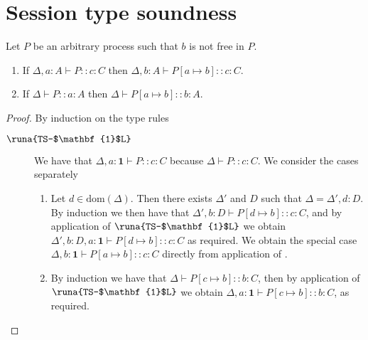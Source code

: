 \chapter{Session type soundness}\label{app:dasetallsoundness}
\setcounter{theorem}{11}
%

\begin{lemma}
Let $P$ be an arbitrary process such that $b$ is not free in $P$. 
\begin{enumerate}
\item If $\Delta,a:A\vdash P :: c\!:\!C$ then $\Delta,b:A\vdash P[a\mapsto b] :: c\!:\!C$.

\item If $\Delta\vdash P :: a\!:\!A$ then $\Delta\vdash P[a\mapsto b] :: b\!:\!A$.
\end{enumerate}
\begin{proof}
By induction on the type rules
\begin{description}
\item[$\runa{TS-$\mathbf{1}$L}$] We have that $\Delta,a:\mathbf{1} \vdash P :: c\!:\!C$ because $\Delta \vdash P :: c\!:\!C$. We consider the cases separately
\begin{enumerate}
    \item Let $d\in\text{dom}(\Delta)$. Then there exists $\Delta'$ and $D$ such that $\Delta=\Delta',d:D$. By induction we then have that $\Delta',b:D\vdash P[d\mapsto b] :: c\!:\!C$, and by application of $\runa{TS-$\mathbf{1}$L}$ we obtain $\Delta',b:D,a:\mathbf{1}\vdash P[d\mapsto b] :: c\!:\!C$ as required. We obtain the special case $\Delta,b:\mathbf{1}\vdash P[a\mapsto b] :: c\!:\!C$ directly from application of .
    
    \item By induction we have that $\Delta\vdash P[c\mapsto b] :: b\!:\!C$, then by application of $\runa{TS-$\mathbf{1}$L}$ we obtain $\Delta,a:\mathbf{1}\vdash P[c\mapsto b] :: b\!:\!C$, as required.
\end{enumerate}



\end{description}
\end{proof}
\end{lemma}
